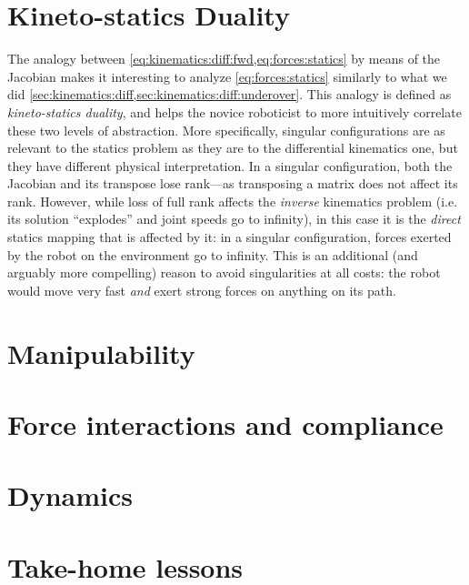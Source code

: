 


\section{Kineto-statics Duality}

The analogy between \cref{eq:kinematics:diff:fwd,eq:forces:statics} by means of the Jacobian makes it interesting to analyze \cref{eq:forces:statics} similarly to what we did \cref{sec:kinematics:diff,sec:kinematics:diff:underover}.
This analogy is defined as \textsl{kineto-statics duality}, and helps the novice roboticist to more intuitively correlate these two levels of abstraction.
More specifically, singular configurations are as relevant to the statics problem as they are to the differential kinematics one, but they have different physical interpretation.
In a singular configuration, both the Jacobian and its transpose lose rank---as transposing a matrix does not affect its rank. However, while loss of full rank affects the \textsl{inverse} kinematics problem (i.e. its solution ``explodes'' and joint speeds go to infinity), in this case it is the \textsl{direct} statics mapping that is affected by it: in a singular configuration, forces exerted by the robot on the environment go to infinity.
This is an additional (and arguably more compelling) reason to avoid singularities at all costs: the robot would move very fast \textsl{and} exert strong forces on anything on its path.

\section{Manipulability}

\section{Force interactions and compliance}

\section{Dynamics}\label{ch:forces:dynamics}


\section*{Take-home lessons}

